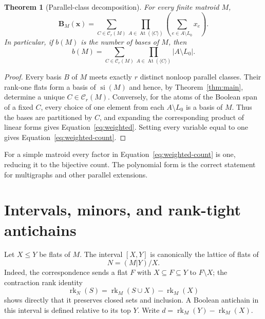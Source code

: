 \documentclass[11pt]{article}
\newtheorem{theorem}{Theorem}[section]
\theoremstyle{definition}
\theoremstyle{remark}
\newcommand{\rk}{\operatorname{rk}}
\newcommand{\si}{\operatorname{si}}
\newcommand{\cC}{\mathcal C}
\begin{document}
\begin{theorem}[Parallel-class decomposition]\label{thm:weighted}
For every finite matroid $M$,
\begin{equation}\label{eq:weighted}
 \boxed{
 \mathbf B_M(\mathbf x)
 =\sum_{C\in\cC_r(M)}
   \prod_{A\in\operatorname{At}(\langle C\rangle)}
   \left(\sum_{e\in A\setminus L_0}x_e\right).}
\end{equation}
In particular, if $b(M)$ is the number of bases of $M$, then
\begin{equation}\label{eq:weighted-count}
 b(M)=\sum_{C\in\cC_r(M)}
 \prod_{A\in\operatorname{At}(\langle C\rangle)}|A\setminus L_0|.
\end{equation}
\end{theorem}

\begin{proof}
Every basis $B$ of $M$ meets exactly $r$ distinct nonloop parallel classes.
Their rank-one flats form a basis of $\si(M)$ and hence, by
Theorem~\ref{thm:main}, determine a unique $C\in\cC_r(M)$.  Conversely, for
the atoms of the Boolean span of a fixed $C$, every choice of one element
from each $A\setminus L_0$ is a basis of $M$.  Thus the bases are partitioned
by $C$, and expanding the corresponding product of linear forms gives
Equation~\eqref{eq:weighted}.
Setting every variable equal to one gives
Equation~\eqref{eq:weighted-count}.
\end{proof}

For a simple matroid every factor in Equation~\eqref{eq:weighted-count} is
one, reducing it to the bijective count.  The polynomial form is the correct
statement for multigraphs and other parallel extensions.

\section{Intervals, minors, and rank-tight antichains}

Let $X\le Y$ be flats of $M$.  The interval $[X,Y]$ is canonically the
lattice of flats of
\[
 N=(M|Y)/X.
\]
Indeed, the correspondence sends a flat $F$ with $X\subseteq F\subseteq Y$
to $F\setminus X$; the contraction rank identity
\[
 \rk_N(S)=\rk_M(S\cup X)-\rk_M(X)
\]
shows directly that it preserves closed sets and inclusion.  A Boolean
antichain in this interval is defined relative
to its top $Y$.  Write $d=\rk_M(Y)-\rk_M(X)$.
\end{document}
